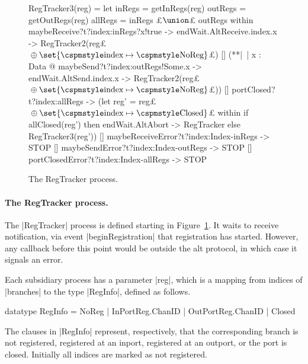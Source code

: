 \begin{figure}
\begin{cspm}
RegTracker3(reg) = 
  let inRegs = getInRegs(reg) 
      outRegs = getOutRegs(reg)
      allRegs = inRegs £$\union$£ outRegs within
  maybeReceive?t?index:inRegs?x!true -> endWait.AltReceive.index.x -> 
     RegTracker2(reg£%
    $\null\oplus \set{\CSPMMR{index} \mapsto \CSPMMR{NoReg}}$£)
  [] (**|~| x : Data @ maybeSend?t?index:outRegs!Some.x -> endWait.AltSend.index.x -> 
        RegTracker2(reg£$\null\oplus \set{\CSPMMR{index} \mapsto \CSPMMR{NoReg}}$£))
  [] portClosed?t?index:allRegs -> 
        (let reg' = reg£%
      $\null\oplus \set{\CSPMMR{index} \mapsto \CSPMMR{Closed}}$£ within
         if allClosed(reg') then endWait.AltAbort -> RegTracker else RegTracker3(reg'))
  [] maybeReceiveError?t?index:Index-inRegs -> STOP
  [] maybeSendError?t?index:Index-outRegs -> STOP
  [] portClosedError?t?index:Index-allRegs -> STOP
\end{cspm}
\caption{The {\scalastyle RegTracker} process. 
\label{fig:RegTracker}}
\end{figure}




\paragraph{The {\scalashape RegTracker} process.}

The |RegTracker| process is defined starting in Figure~\ref{fig:RegTracker}.
It waits to receive notification, via event |beginRegistration| that
registration has started.  However, any callback before this point would be
outside the alt protocol, in which case it signals an error.

Each subsidiary process has a parameter |reg|, which is a mapping from
indices of |branches| to the type |RegInfo|, defined as follows.
%
\begin{cspm}
  datatype RegInfo = NoReg | InPortReg.ChanID | OutPortReg.ChanID | Closed
\end{cspm}
%
The clauses in |RegInfo| represent, respectively, that the corresponding
branch is not registered, registered at an inport, registered at an outport,
or the port is closed.  Initially all indices are marked as not registered.

